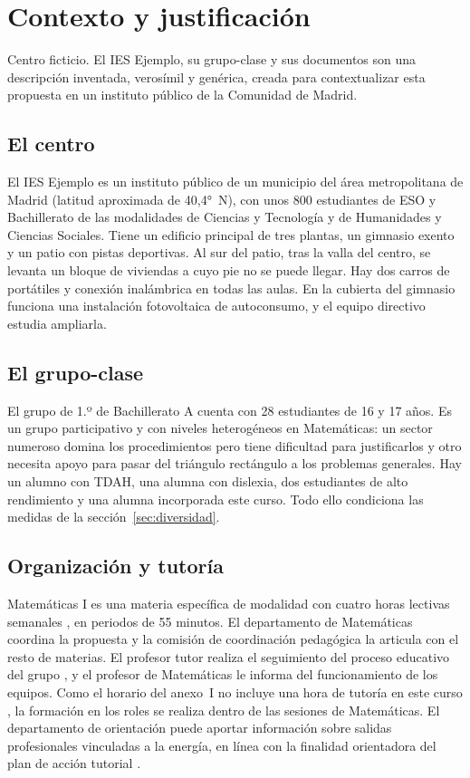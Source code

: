 \section{Contexto y justificación}

\begin{nota}{Centro ficticio.}
El IES Ejemplo, su grupo-clase y sus documentos son una descripción inventada, verosímil y genérica, creada para contextualizar esta propuesta en un instituto público de la Comunidad de Madrid.
\end{nota}

\subsection{El centro}
El IES Ejemplo es un instituto público de un municipio del área metropolitana de Madrid (latitud aproximada de 40,4°~N), con unos 800 estudiantes de ESO y Bachillerato de las modalidades de Ciencias y Tecnología y de Humanidades y Ciencias Sociales. Tiene un edificio principal de tres plantas, un gimnasio exento y un patio con pistas deportivas. Al sur del patio, tras la valla del centro, se levanta un bloque de viviendas a cuyo pie no se puede llegar. Hay dos carros de portátiles y conexión inalámbrica en todas las aulas. En la cubierta del gimnasio funciona una instalación fotovoltaica de autoconsumo, y el equipo directivo estudia ampliarla.

\subsection{El grupo-clase}
El grupo de 1.º de Bachillerato A cuenta con 28 estudiantes de 16 y 17 años. Es un grupo participativo y con niveles heterogéneos en Matemáticas: un sector numeroso domina los procedimientos pero tiene dificultad para justificarlos y otro necesita apoyo para pasar del triángulo rectángulo a los problemas generales. Hay un alumno con TDAH, una alumna con dislexia, dos estudiantes de alto rendimiento y una alumna incorporada este curso. Todo ello condiciona las medidas de la sección~\ref{sec:diversidad}.

\subsection{Organización y tutoría}
Matemáticas I es una materia específica de modalidad con cuatro horas lectivas semanales \parencite[anexo~I, p.~32]{decreto64}, en periodos de 55 minutos. El departamento de Matemáticas coordina la propuesta y la comisión de coordinación pedagógica la articula con el resto de materias. El profesor tutor realiza el seguimiento del proceso educativo del grupo \parencite[art.~5.1, p.~17]{decreto64}, y el profesor de Matemáticas le informa del funcionamiento de los equipos. Como el horario del anexo~I no incluye una hora de tutoría en este curso \parencite[p.~32]{decreto64}, la formación en los roles se realiza dentro de las sesiones de Matemáticas. El departamento de orientación puede aportar información sobre salidas profesionales vinculadas a la energía, en línea con la finalidad orientadora del plan de acción tutorial \parencite[art.~5.3, p.~17]{decreto64}.

